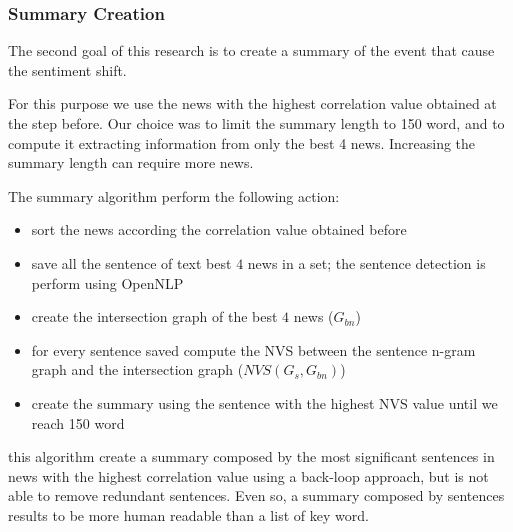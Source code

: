 \subsubsection*{Summary Creation}
The second goal of this research is to create a summary of the event that cause the sentiment shift. 

For this purpose we use the news with the highest correlation value obtained at the step before.
Our choice was to limit the summary length to 150 word, and to compute it extracting information from only the best 4 news. Increasing the summary length can require more news.

The summary algorithm perform the following action:
\begin{itemize}
	\item sort the news according the correlation value obtained before
	\item save all the sentence of text best $4$ news in a set; the sentence detection is perform using OpenNLP
	\item create the intersection graph of the best $4$ news ($G_{bn}$)
	\item for every sentence saved compute the NVS between the sentence n-gram graph and the intersection graph ($NVS( G_{s}, G_{bn} )$)
	\item create the summary using the sentence with the highest NVS value until we reach 150 word
\end{itemize}
this algorithm create a summary composed by the most significant sentences in news with the highest correlation value using a back-loop approach, but is not able to remove redundant sentences. Even so, a summary composed by sentences results to be more human readable than a list of key word.
